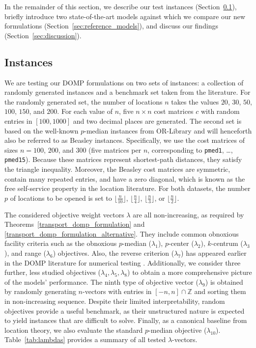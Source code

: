 \documentclass[letterpaper]{article}
\begin{document}
In the remainder of this section, we describe our test instances (Section~\ref{sec:instances}), briefly introduce two state-of-the-art models against which we compare our new formulations (Section~\ref{sec:reference_models}), and discuss our findings (Section~\ref{sec:discussion}).

\subsection{Instances}\label{sec:instances}
We are testing our DOMP formulations on two sets of instances: a collection of randomly generated instances and a benchmark set taken from the literature. For the randomly generated set, the number of locations $n$ takes the values $20$, $30$, $50$, $100$, $150$, and $200$. For each value of $n$, five $n \times n$ cost matrices $c$ with random entries in $[100, 1000]$ and two decimal places are generated. The second set is based on the well-known $p$-median instances from OR-Library \citep{Beasley_original_dataset} and will henceforth also be referred to as Beasley instances. Specifically, we use the cost matrices of sizes $n = 100$, $200$, and $300$ (five matrices per $n$, corresponding to \texttt{pmed1}, \dots, \texttt{pmed15}). Because these matrices represent shortest-path distances, they satisfy the triangle inequality. Moreover, the Beasley cost matrices are symmetric, contain many repeated entries, and have a zero diagonal, which is known as the free self-service property in the location literature. For both datasets, the number $p$ of locations to be opened is set to $\lfloor \frac{n}{10} \rfloor$, $\lfloor \frac{n}{4} \rfloor$, $\lfloor \frac{n}{3} \rfloor$, or $\lfloor \frac{n}{2} \rfloor$.

The considered objective weight vectors $\lambda$ are all non-increasing, as required by Theorems~\ref{transport_domp_formulation} and \ref{transport_domp_formulation_alternative}. They include common obnoxious facility criteria such as the obnoxious $p$-median ($\lambda_1$), $p$-center ($\lambda_2$), $k$-centrum ($\lambda_3$), and range ($\lambda_6$) objectives. Also, the reverse criterion ($\lambda_7$) has appeared earlier in the DOMP literature for numerical testing \citep[e.g.,][]{dominguez_discrete_2020, ljubic_benders_2024}. Additionally, we consider three further, less studied objectives ($\lambda_4, \lambda_5, \lambda_8$) to obtain a more comprehensive picture of the models' performance. The ninth type of objective vector ($\lambda_9$) is obtained by randomly generating $n$-vectors with entries in $[-n, n] \cap \mathbb{Z}$ and sorting them in non-increasing sequence. Despite their limited interpretability, random objectives provide a useful benchmark, as their unstructured nature is expected to yield instances that are difficult to solve. Finally, as a canonical baseline from location theory, we also evaluate the standard $p$-median objective ($\lambda_{10}$). Table~\ref{tab:lambdas} provides a summary of all tested $\lambda$-vectors.
\end{document}
